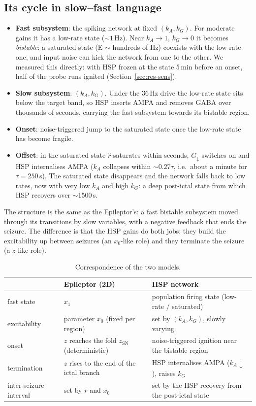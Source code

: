 \documentclass[11pt]{article}
\newcommand{\kA}{k_A}
\newcommand{\kG}{k_G}
\newcommand{\zsn}{z_{\mathrm{SN}}}
\begin{document}
\subsection{Its cycle in slow--fast language}\label{sec:slowfast}
\begin{itemize}
\item \textbf{Fast subsystem}: the spiking network at fixed $(\kA, \kG)$. For moderate gains it has a low-rate state
($\sim1$\,Hz). Near $\kA\to1$, $\kG\to0$ it becomes \emph{bistable}: a saturated state (E $\sim$ hundreds of Hz) coexists
with the low-rate one, and input noise can kick the network from one to the other. We measured this directly: with
HSP frozen at the state 5\,min before an onset, half of the probe runs ignited (Section~\ref{sec:res-sens}).
\item \textbf{Slow subsystem}: $(\kA,\kG)$. Under the 36\,Hz drive the low-rate state sits below the target band, so HSP
inserts AMPA and removes GABA over thousands of seconds, carrying the fast subsystem towards its bistable region.
\item \textbf{Onset}: noise-triggered jump to the saturated state once the low-rate state has become fragile.
\item \textbf{Offset}: in the saturated state $\hat r$ saturates within seconds, $G_\downarrow$ switches on and HSP
internalises AMPA ($\kA$ collapses within $\sim0.27\tau$, i.e.\ about a minute for $\tau=250$\,s). The saturated state disappears and the
network falls back to low rates, now with very low $\kA$ and high $\kG$: a deep post-ictal state from which HSP
recovers over $\sim$1500\,s.
\end{itemize}
The structure is the same as the Epileptor's: a fast bistable subsystem moved through its transitions by slow
variables, with a negative feedback that ends the seizure. The difference is that the HSP gains do both jobs: they
build the excitability up between seizures (an $x_0$-like role) and they terminate the seizure (a $z$-like role).

\begin{table}[H]\centering\small
\begin{tabular}{p{3.6cm}p{5.4cm}p{5.6cm}}
\toprule
 & Epileptor (2D) & HSP network \\
\midrule
fast state & $x_1$ & population firing state (low-rate / saturated) \\
excitability & parameter $x_0$ (fixed per region) & set by $(\kA,\kG)$, slowly varying \\
onset & $z$ reaches the fold $\zsn$ (deterministic) & noise-triggered ignition near the bistable region \\
termination & $z$ rises to the end of the ictal branch & HSP internalises AMPA ($\kA\downarrow$), raises $\kG$ \\
inter-seizure interval & set by $r$ and $x_0$ & set by the HSP recovery from the post-ictal state \\
\bottomrule
\end{tabular}
\caption{Correspondence of the two models.}
\end{table}
\end{document}
